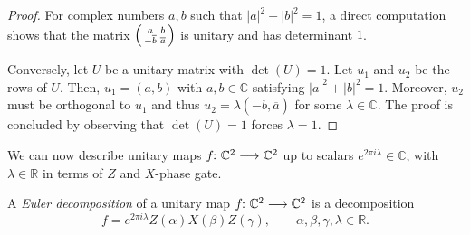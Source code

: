 \documentclass[a4paper, oneside, 12pt]{amsart}
\begin{document}
\begin{proof}
  For complex numbers \( a, b \) such that \( |a|^2 + |b|^2 = 1 \), a direct computation shows that the matrix
  \(
  \begin{psmallmatrix}
    a & b \\
    -\overline{b} & \overline{a}
  \end{psmallmatrix}
  \)
  is unitary and has determinant \(1\).

  Conversely, let \( U \) be a unitary matrix with \(\det(U) = 1\).
  Let \( u_1 \) and \( u_2 \) be the rows of \( U \).
  Then, \( u_1 = (a, b) \) with \( a, b \in \mathbb{C} \) satisfying \(|a|^{2} + |b|^{2} = 1\).
  Moreover, \( u_2 \) must be orthogonal to \( u_1 \) and thus \( u_2 = \lambda (-\overline{b}, \overline{a}) \) for some \( \lambda \in \mathbb{C} \).
  The proof is concluded by observing that \(\det(U) = 1\) forces \( \lambda = 1 \).
\end{proof}

We can now describe  unitary maps \(f \from \mathbb{C}^{2} \to \mathbb{C}^{2}\) up to scalars \(e^{2\pi i \lambda} \in \mathbb{C}\), with \(\lambda \in \mathbb{R}\) in terms of \(Z\) and \(X\)-phase gate.

\begin{definition}\label{def:euler-decomposition}
  A \emph{Euler decomposition} of a unitary map \(f \from \mathbb{C}^{2} \to \mathbb{C}^{2}\) is a decomposition
  \begin{equation*}
     f = e^{2 \pi i \lambda} Z(\alpha) X(\beta) Z(\gamma), \qquad \alpha, \beta, \gamma, \lambda \in \mathbb{R}.
  \end{equation*}
\end{definition}
\end{document}
